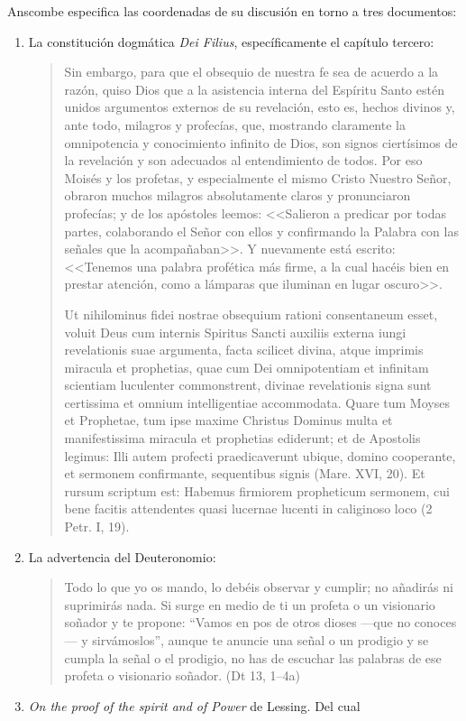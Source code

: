 Anscombe especifica las coordenadas de su discusión en torno a tres documentos:
\begin{enumerate}
\item La constitución dogmática \emph{Dei Filius}, específicamente el
  capítulo tercero: \blockquote[Ut nihilominus fidei nostrae obsequium rationi
  consentaneum esset, voluit Deus cum internis Spiritus Sancti auxiliis externa
  iungi revelationis suae argumenta, facta scilicet divina, atque imprimis
  miracula et prophetias, quae cum Dei omnipotentiam et infinitam scientiam
  luculenter commonstrent, divinae revelationis signa sunt certissima et omnium
  intelligentiae accommodata. Quare tum Moyses et Prophetae, tum ipse maxime
  Christus Dominus multa et manifestissima miracula et prophetias ediderunt; et
  de Apostolis legimus: Illi autem profecti praedicaverunt ubique, domino
  cooperante, et sermonem confirmante, sequentibus signis (Mare. XVI, 20). Et
  rursum scriptum est: Habemus firmiorem propheticum sermonem, cui bene facitis
  attendentes quasi lucernae lucenti in caliginoso loco (2 Petr. I, 19).]{Sin
    embargo, para que el obsequio de nuestra fe sea de acuerdo a la razón, quiso
    Dios que a la asistencia interna del Espíritu Santo estén unidos argumentos
    externos de su revelación, esto es, hechos divinos y, ante todo, milagros y
    profecías, que, mostrando claramente la omnipotencia y conocimiento infinito
    de Dios, son signos ciertísimos de la revelación y son adecuados al
    entendimiento de todos. Por eso Moisés y los profetas, y especialmente el
    mismo Cristo Nuestro Señor, obraron muchos milagros absolutamente claros y
    pronunciaron profecías; y de los apóstoles leemos: <<Salieron a predicar por
    todas partes, colaborando el Señor con ellos y confirmando la Palabra con
    las señales que la acompañaban>>. Y nuevamente está escrito: <<Tenemos una
    palabra profética más firme, a la cual hacéis bien en prestar atención, como
    a lámparas que iluminan en lugar oscuro>>.}
\item La advertencia del Deuteronomio: \blockquote{Todo lo que yo os mando, lo
    debéis observar y cumplir; no añadirás ni suprimirás nada. Si surge en medio
    de ti un profeta o un visionario soñador y te propone: \enquote{Vamos en pos
      de otros dioses ---que no conoces--- y sirvámoslos}, aunque te anuncie una
    señal o un prodigio y se cumpla la señal o el prodigio, no has de escuchar
    las palabras de ese profeta o visionario soñador. (Dt 13, 1--4a)}
\item \emph{On the proof of the spirit and of Power} de Lessing. Del cual

\end{enumerate}

